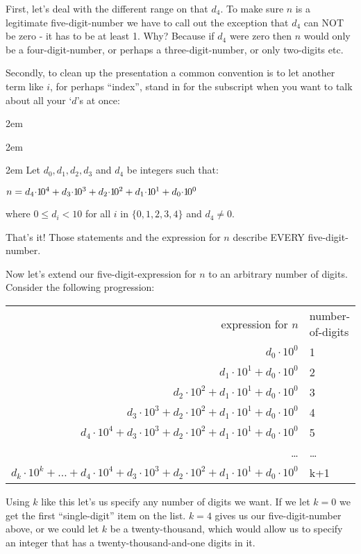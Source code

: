 \documentclass{article}
\newenvironment{jprIn}{\begin{adjustwidth}{2em}{}}{\end{adjustwidth}}
\begin{document}
First, let's deal with the different range on that $d_4$. To make sure $n$ is a
legitimate five-digit-number we have to
call out the exception that $d_4$ can NOT be zero - it has to be at least 1.
Why? Because if $d_4$ were zero then $n$ would only be a
four-digit-number, or perhaps a three-digit-number, or only two-digits etc.

Secondly, to clean up the presentation
a common convention
is to let another term like $i$, for perhaps ``index'', stand in for the subscript
when you want to talk about all your `$d$'s at once:
\begin{jprIn}
\begin{jprIn}
\begin{jprIn}
Let $d_0, d_1, d_2,d_3$ and $d_4$ be integers such that:

\hspace{3em}$n
=d_4{\cdot}{1\hspace{-0.12em}0}^4
+d_3{\cdot}{1\hspace{-0.12em}0}^3
+d_2{\cdot}{1\hspace{-0.12em}0}^2
+d_1{\cdot}{1\hspace{-0.12em}0}^1
+d_0{\cdot}{1\hspace{-0.12em}0}^0$

where $0\le{}d_i<10$ for all $i$ in $\{0,1,2,3,4\}$ and $d_4\ne0$.
\end{jprIn}
\end{jprIn}
\end{jprIn}
That's it! Those statements and the expression for $n$ describe EVERY five-digit-number.

\break
Now let's extend
our five-digit-expression for $n$ to an arbitrary
number of digits.
Consider the following progression:
\begin{center}
\begin{tabular}{r l}
expression for $n$ & number-of-digits\\
$d_0{\cdot}10^0$ & 1\\
$d_1{\cdot}10^1+d_0{\cdot}10^0$ & 2\\
$d_2{\cdot}10^2+d_1{\cdot}10^1+d_0{\cdot}10^0$ & 3\\
$d_3{\cdot}10^3+d_2{\cdot}10^2+d_1{\cdot}10^1+d_0{\cdot}10^0$ & 4\\
$d_4{\cdot}10^4+d_3{\cdot}10^3+d_2{\cdot}10^2+d_1{\cdot}10^1+d_0{\cdot}10^0$ & 5\\
\dots{} & \dots{}\\
$d_k{\cdot}10^k+\dots{}+d_4{\cdot}10^4+d_3{\cdot}10^3+d_2{\cdot}10^2+d_1{\cdot}10^1+d_0{\cdot}10^0$ & k+1
\end{tabular}
\end{center}
Using $k$ like this let's us specify any number of digits we want.
If we let $k=0$ we get the first ``single-digit'' 
item on the list.  $k=4$ gives us our five-digit-number above,
or we could let $k$ be a twenty-thousand, which would allow
us to specify an integer that has a twenty-thousand-and-one
digits in it.
\end{document}
